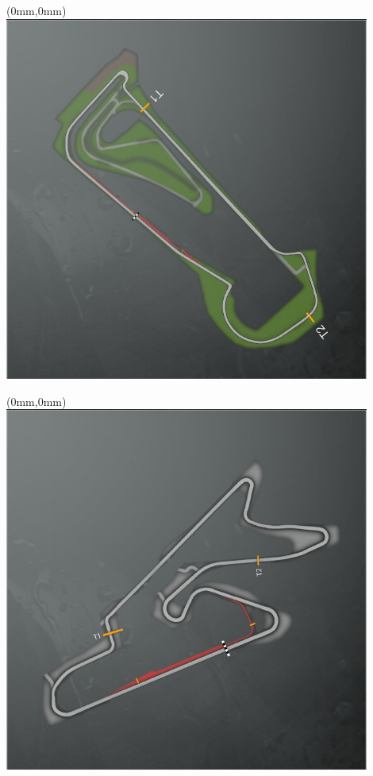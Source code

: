 \null\newpage
\begin{textblock*}{30mm}(0mm,0mm)%
\includegraphics[width=120mm]{TR/2015-05-20_00061.png}
\end{textblock*}
\null\newpage
\begin{textblock*}{30mm}(0mm,0mm)%
\includegraphics[width=120mm]{TR/2015-05-20_00026.png}
\end{textblock*}
